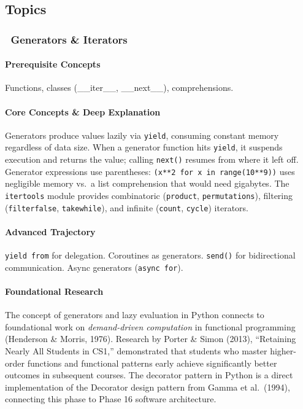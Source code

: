 \documentclass[11pt, a4paper, oneside]{report}
\newcommand{\mustmaster}[1]{\subsubsection{\texorpdfstring{\fcolorbox{blue!40!black}{blue!8}{\footnotesize\bfseries\color{blue!40!black} MUST MASTER}~#1}{#1}}}
\begin{document}
\subsection*{Topics}

\mustmaster{Generators \& Iterators}

\paragraph{Prerequisite Concepts} Functions, classes (\_\_iter\_\_, \_\_next\_\_), comprehensions.

\paragraph{Core Concepts \& Deep Explanation} Generators produce values lazily via \texttt{yield}, consuming constant memory regardless of data size. When a generator function hits \texttt{yield}, it suspends execution and returns the value; calling \texttt{next()} resumes from where it left off. Generator expressions use parentheses: \texttt{(x**2 for x in range(10**9))} uses negligible memory vs.\ a list comprehension that would need gigabytes. The \texttt{itertools} module provides combinatoric (\texttt{product}, \texttt{permutations}), filtering (\texttt{filterfalse}, \texttt{takewhile}), and infinite (\texttt{count}, \texttt{cycle}) iterators.

\paragraph{Advanced Trajectory} \texttt{yield from} for delegation. Coroutines as generators. \texttt{send()} for bidirectional communication. Async generators (\texttt{async for}).


\paragraph{Foundational Research} The concept of generators and lazy evaluation in Python connects to foundational work on \emph{demand-driven computation} in functional programming (Henderson \& Morris, 1976). Research by Porter \& Simon (2013), ``Retaining Nearly All Students in CS1,'' demonstrated that students who master higher-order functions and functional patterns early achieve significantly better outcomes in subsequent courses. The decorator pattern in Python is a direct implementation of the Decorator design pattern from Gamma et al.\ (1994), connecting this phase to Phase 16 software architecture.
\end{document}
